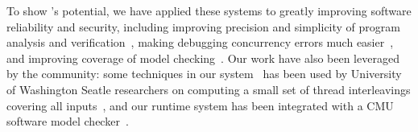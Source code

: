 To show \smt's potential, we have applied these systems to greatly improving
software reliability and security, including improving precision and simplicity
of program analysis and verification~\cite{wu:pldi12}, making debugging
concurrency errors much easier~\cite{cui:tern:osdi10}, and improving coverage of
model checking~\cite{parrot:sosp13}. Our work have also been leveraged by the
community: some techniques in our \tern system~\cite{cui:tern:osdi10} has been
used by University of Washington Seatle researchers on computing a small set of
thread interleavings covering all inputs~\cite{ics:oopsla13}, and our \parrot
runtime system has been integrated with a CMU software model
checker~\cite{dbug:spin11}.



